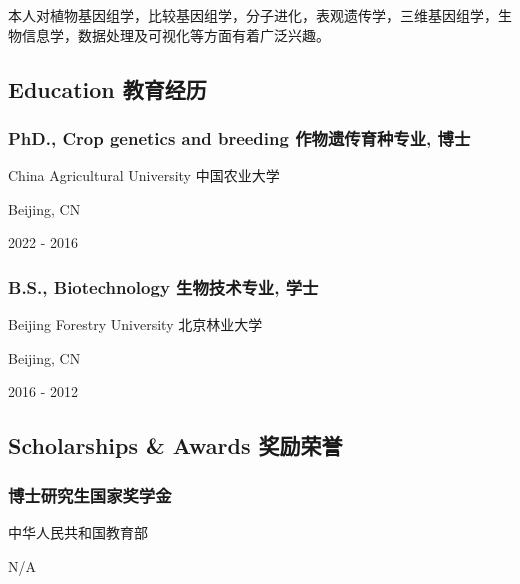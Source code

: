 \documentclass[]{article}
\begin{document}
本人对植物基因组学，比较基因组学，分子进化，表观遗传学，三维基因组学，生物信息学，数据处理及可视化等方面有着广泛兴趣。

\hypertarget{education-ux6559ux80b2ux7ecfux5386}{%
\subsection{Education
教育经历}\label{education-ux6559ux80b2ux7ecfux5386}}

\hypertarget{phd.-crop-genetics-and-breeding-ux4f5cux7269ux9057ux4f20ux80b2ux79cdux4e13ux4e1a-ux535aux58eb}{%
\subsubsection{PhD., Crop genetics and breeding 作物遗传育种专业,
博士}\label{phd.-crop-genetics-and-breeding-ux4f5cux7269ux9057ux4f20ux80b2ux79cdux4e13ux4e1a-ux535aux58eb}}

China Agricultural University 中国农业大学

Beijing, CN

2022 - 2016

\hypertarget{b.s.-biotechnology-ux751fux7269ux6280ux672fux4e13ux4e1a-ux5b66ux58eb}{%
\subsubsection{B.S., Biotechnology 生物技术专业,
学士}\label{b.s.-biotechnology-ux751fux7269ux6280ux672fux4e13ux4e1a-ux5b66ux58eb}}

Beijing Forestry University 北京林业大学

Beijing, CN

2016 - 2012

\hypertarget{scholarships-awards-ux5956ux52b1ux8363ux8a89}{%
\subsection{Scholarships \& Awards
奖励荣誉}\label{scholarships-awards-ux5956ux52b1ux8363ux8a89}}

\hypertarget{ux535aux58ebux7814ux7a76ux751fux56fdux5bb6ux5956ux5b66ux91d1}{%
\subsubsection{博士研究生国家奖学金}\label{ux535aux58ebux7814ux7a76ux751fux56fdux5bb6ux5956ux5b66ux91d1}}

中华人民共和国教育部

N/A
\end{document}
